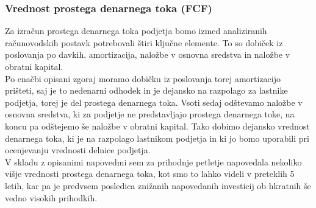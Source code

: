 \documentclass[12pt,a4paper]{amsart}
\theoremstyle{definition} %
\theoremstyle{plain} %
\begin{document}
\subsubsection{Vrednost prostega denarnega toka (FCF)}
Za izračun prostega denarnega toka podjetja bomo izmed analiziranih računovodskih postavk potrebovali štiri ključne elemente. To so dobiček iz poslovanja po davkih, amortizacija, naložbe v osnovna sredstva in naložbe v obratni kapital. \\
Po enačbi opisani zgoraj moramo dobičku iz poslovanja torej amortizacijo prišteti, saj je to nedenarni odhodek in je dejansko na razpolago za lastnike podjetja, torej je del prostega denarnega toka. Vsoti sedaj odštevamo naložbe v osnovna sredstva, ki za podjetje ne predstavljajo prostega denarnega toke, na koncu pa odštejemo še naložbe v obratni kapital. Tako dobimo dejansko vrednost denarnega toka, ki je na razpolago lastnikom podjetja in ki jo bomo uporabili pri ocenjevanju vrednosti delnice podjetja.\\
V skladu z opisanimi napovedmi sem za prihodnje petletje napovedala nekoliko višje vrednosti prostega denarnega toka, kot smo to lahko videli v preteklih 5 letih, kar pa je predvsem posledica znižanih napovedanih investicij ob hkratnih še vedno visokih prihodkih.
\end{document}
